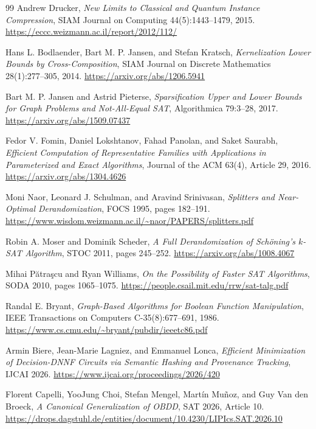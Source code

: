 \documentclass[11pt]{article}
\begin{document}
\begin{thebibliography}{99}
Andrew Drucker,
\emph{New Limits to Classical and Quantum Instance Compression},
SIAM Journal on Computing 44(5):1443--1479, 2015.
\url{https://eccc.weizmann.ac.il/report/2012/112/}

Hans L. Bodlaender, Bart M. P. Jansen, and Stefan Kratsch,
\emph{Kernelization Lower Bounds by Cross-Composition},
SIAM Journal on Discrete Mathematics 28(1):277--305, 2014.
\url{https://arxiv.org/abs/1206.5941}

Bart M. P. Jansen and Astrid Pieterse,
\emph{Sparsification Upper and Lower Bounds for Graph Problems and
Not-All-Equal SAT},
Algorithmica 79:3--28, 2017.
\url{https://arxiv.org/abs/1509.07437}

Fedor V. Fomin, Daniel Lokshtanov, Fahad Panolan, and Saket Saurabh,
\emph{Efficient Computation of Representative Families with Applications in
Parameterized and Exact Algorithms},
Journal of the ACM 63(4), Article 29, 2016.
\url{https://arxiv.org/abs/1304.4626}

Moni Naor, Leonard J. Schulman, and Aravind Srinivasan,
\emph{Splitters and Near-Optimal Derandomization},
FOCS 1995, pages 182--191.
\url{https://www.wisdom.weizmann.ac.il/~naor/PAPERS/splitters.pdf}

Robin A. Moser and Dominik Scheder,
\emph{A Full Derandomization of Sch\"oning's $k$-SAT Algorithm},
STOC 2011, pages 245--252.
\url{https://arxiv.org/abs/1008.4067}

Mihai P\u{a}tra\c{s}cu and Ryan Williams,
\emph{On the Possibility of Faster SAT Algorithms},
SODA 2010, pages 1065--1075.
\url{https://people.csail.mit.edu/rrw/sat-talg.pdf}

Randal E. Bryant,
\emph{Graph-Based Algorithms for Boolean Function Manipulation},
IEEE Transactions on Computers C-35(8):677--691, 1986.
\url{https://www.cs.cmu.edu/~bryant/pubdir/ieeetc86.pdf}

Armin Biere, Jean-Marie Lagniez, and Emmanuel Lonca,
\emph{Efficient Minimization of Decision-DNNF Circuits via Semantic Hashing
and Provenance Tracking},
IJCAI 2026.
\url{https://www.ijcai.org/proceedings/2026/420}

Florent Capelli, YooJung Choi, Stefan Mengel, Mart\'in Mu\~noz, and
Guy Van den Broeck,
\emph{A Canonical Generalization of OBDD},
SAT 2026, Article 10.
\url{https://drops.dagstuhl.de/entities/document/10.4230/LIPIcs.SAT.2026.10}


\end{thebibliography}
\end{document}
